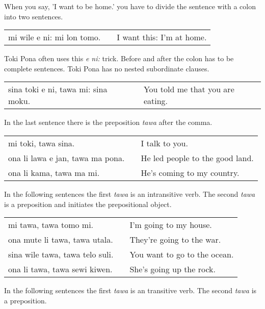 When you say, 'I want to be home.' you have to divide the sentence with a colon into two sentences.

\begin{supertabular}{p{5,5cm}|ll}
    mi wile e ni: mi lon tomo. &  & I want this: I'm at home. \\
\end{supertabular}

Toki Pona often uses this \textit{e ni:} trick.
Before and after the colon has to be complete sentences.
Toki Pona has no nested subordinate clauses.

\begin{supertabular}{p{5,5cm}|ll}
    sina toki e ni, tawa mi: sina moku. &  & You told me that you are eating. \\
\end{supertabular}

In the last sentence there is the preposition \textit{tawa} after the comma.

\begin{supertabular}{p{5,5cm}|ll}
    mi toki, tawa sina.              &  & I talk to you.                  \\
    ona li lawa e jan, tawa ma pona. &  & He led people to the good land. \\
    ona li kama, tawa ma mi.         &  & He's coming to my country.      \\
\end{supertabular}

In the following sentences the first \textit{tawa} is an intransitive verb.
The second \textit{tawa} is a preposition and initiates the prepositional object.

\begin{supertabular}{p{5,5cm}|ll}
    mi tawa, tawa tomo mi.          &  & I'm going to my house.       \\
    ona mute li tawa, tawa utala.   &  & They're going to the war.    \\
    sina wile tawa, tawa telo suli. &  & You want to go to the ocean. \\
    ona li tawa, tawa sewi kiwen.   &  & She's going up the rock.     \\
\end{supertabular}

In the following sentences the first \textit{tawa} is an transitive verb.
The second \textit{tawa} is a preposition.

